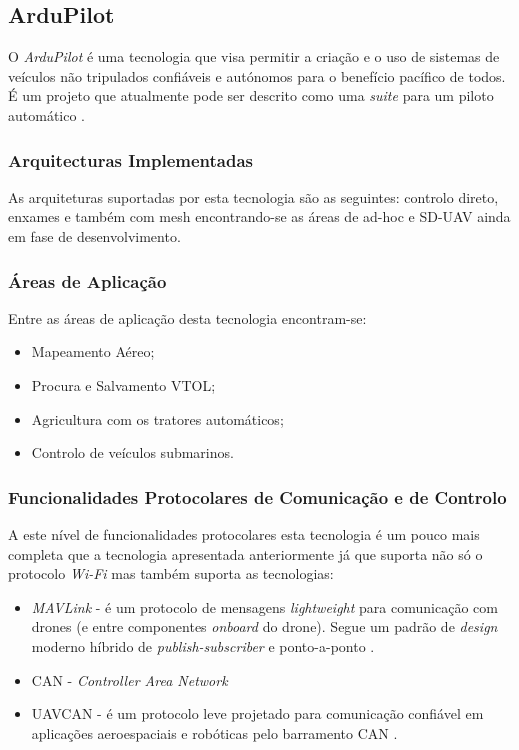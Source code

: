 \subsection{ArduPilot}
O \textit{ArduPilot} é uma tecnologia que visa permitir a criação e o uso de sistemas de veículos não tripulados confiáveis e autónomos para o benefício pacífico de todos. É um projeto que atualmente pode ser descrito como uma \textit{suite} para um piloto automático \cite{ArduPilotCommunity}.

\subsubsection{Arquitecturas Implementadas}

As arquiteturas suportadas por esta tecnologia são as seguintes: controlo direto, enxames e também com mesh encontrando-se as áreas de ad-hoc e SD-UAV ainda em fase de desenvolvimento.

\subsubsection{Áreas de Aplicação}

Entre as áreas de aplicação desta tecnologia encontram-se:
\begin{itemize}
    \item {Mapeamento Aéreo;}
    \item Procura e Salvamento VTOL;
    \item Agricultura com os tratores automáticos;
    \item Controlo de veículos submarinos.
\end{itemize}

\subsubsection{Funcionalidades Protocolares de Comunicação e de Controlo}

A este nível de funcionalidades protocolares esta tecnologia é um pouco mais completa que a tecnologia apresentada anteriormente já que suporta não só o protocolo \textit{Wi-Fi} mas também suporta as tecnologias:
\begin{itemize}
    \item \textit{MAVLink} - é um protocolo de mensagens \textit{lightweight} para comunicação com drones (e entre componentes \textit{onboard} do drone). Segue um padrão de \textit{design} moderno híbrido de \textit{publish-subscriber} e ponto-a-ponto \cite{DronecodeProject}.
    \item CAN - \textit{Controller Area Network}
    \item UAVCAN - é um protocolo leve projetado para comunicação confiável em aplicações aeroespaciais e robóticas pelo barramento CAN \cite{UAVCANdevelopmentteam}.
\end{itemize}

